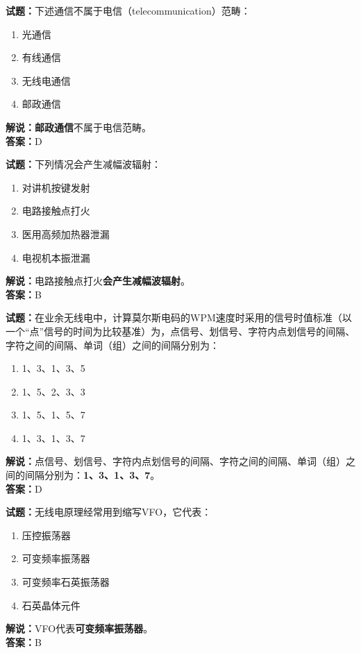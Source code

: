 \documentclass{ctexbook}
\begin{document}
\bigskip


\noindent\textbf{试题：}下述通信不属于电信（telecommunication）范畴：
\begin{enumerate}[leftmargin=3em]
\item 光通信
\item 有线通信
\item 无线电通信
\item 邮政通信
\end{enumerate}
\noindent\textbf{解说：}\textbf{邮政通信}不属于电信范畴。\\\noindent\textbf{答案：}D



\bigskip


\noindent\textbf{试题：}下列情况会产生减幅波辐射：
\begin{enumerate}[leftmargin=3em]
\item 对讲机按键发射
\item 电路接触点打火
\item 医用高频加热器泄漏
\item 电视机本振泄漏
\end{enumerate}
\noindent\textbf{解说：}电路接触点打火\textbf{会产生减幅波辐射}。\\\noindent\textbf{答案：}B




\bigskip


\noindent\textbf{试题：}在业余无线电中，计算莫尔斯电码的WPM速度时采用的信号时值标准（以一个“点”信号的时间为比较基准）为，点信号、划信号、字符内点划信号的间隔、字符之间的间隔、单词（组）之间的间隔分别为：
\begin{enumerate}[leftmargin=3em]
\item 1、3、1、3、5
\item 1、5、2、3、3
\item 1、5、1、5、7
\item 1、3、1、3、7
\end{enumerate}
\noindent\textbf{解说：}点信号、划信号、字符内点划信号的间隔、字符之间的间隔、单词（组）之间的间隔分别为：\textbf{1、3、1、3、7}。\\\noindent\textbf{答案：}D




\bigskip


\noindent\textbf{试题：}无线电原理经常用到缩写VFO，它代表：
\begin{enumerate}[leftmargin=3em]
\item 压控振荡器
\item 可变频率振荡器
\item 可变频率石英振荡器
\item 石英晶体元件
\end{enumerate}
\noindent\textbf{解说：}VFO代表\textbf{可变频率振荡器}。\\\noindent\textbf{答案：}B
\end{document}
